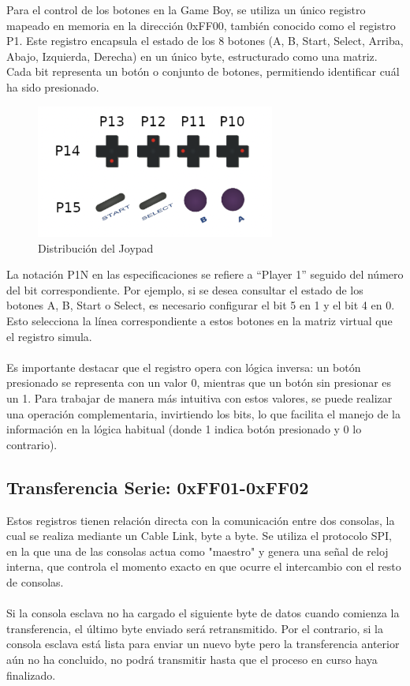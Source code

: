 Para el control de los botones en la Game Boy, se utiliza un único registro mapeado en memoria en la dirección 0xFF00, también conocido como el registro P1. Este registro encapsula el estado de los 8 botones (A, B, Start, Select, Arriba, Abajo, Izquierda, Derecha) en un único byte, estructurado como una matriz. Cada bit representa un botón o conjunto de botones, permitiendo identificar cuál ha sido presionado.

\begin{figure}[H]
    \centering
    \includegraphics[width=0.7\textwidth]{include/images/joypad.png}
    \caption{Distribución del Joypad}
    \label{figure:joypad}
\end{figure}

La notación P1N en las especificaciones se refiere a “Player 1” seguido del número del bit correspondiente. Por ejemplo, si se desea consultar el estado de los botones A, B, Start o Select, es necesario configurar el bit 5 en 1 y el bit 4 en 0. Esto selecciona la línea correspondiente a estos botones en la matriz virtual que el registro simula.
\\\\
Es importante destacar que el registro opera con lógica inversa: un botón presionado se representa con un valor 0, mientras que un botón sin presionar es un 1. Para trabajar de manera más intuitiva con estos valores, se puede realizar una operación complementaria, invirtiendo los bits, lo que facilita el manejo de la información en la lógica habitual (donde 1 indica botón presionado y 0 lo contrario).

\subsection{Transferencia Serie: 0xFF01-0xFF02}

Estos registros tienen relación directa con la comunicación entre dos consolas, la cual se realiza mediante un Cable Link, byte a byte. Se utiliza el protocolo SPI, en la que una de las consolas actua como "maestro" y genera una señal de reloj interna, que controla el momento exacto en que ocurre el intercambio con el resto de consolas.
\\\\
Si la consola esclava no ha cargado el siguiente byte de datos cuando comienza la transferencia, el último byte enviado será retransmitido. Por el contrario, si la consola esclava está lista para enviar un nuevo byte pero la transferencia anterior aún no ha concluido, no podrá transmitir hasta que el proceso en curso haya finalizado.


